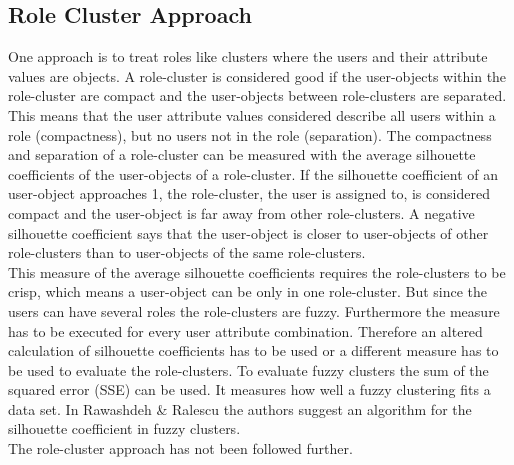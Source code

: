         \subsection{Role Cluster Approach}
        One approach is to treat roles like clusters where the users and their attribute values are objects. A role-cluster is considered good if the user-objects within the role-cluster are compact and the user-objects between role-clusters are separated. This means that the user attribute values considered describe all users within a role (compactness), but no users not in the role (separation). The compactness and separation of a role-cluster can be measured with the average silhouette coefficients of the user-objects of a role-cluster\cite{Han}. If the silhouette coefficient of an user-object approaches 1, the role-cluster, the user is assigned to, is considered compact and the user-object is far away from other role-clusters. A negative silhouette coefficient says that the user-object is closer to user-objects of other role-clusters than to user-objects of the same role-clusters.\\
        This measure of the average silhouette coefficients requires the role-clusters to be crisp, which means a user-object can be only in one role-cluster. But since the users can have several roles the role-clusters are fuzzy. Furthermore the measure has to be executed for every user attribute combination. Therefore an altered calculation of silhouette coefficients has to be used or a different measure has to be used to evaluate the role-clusters. To evaluate fuzzy clusters the sum of the squared error (SSE) can be used\cite{Han}. It measures how well a fuzzy clustering fits a data set. In Rawashdeh \& Ralescu\cite{rawashdeh2012fuzzy} the authors suggest an algorithm for the silhouette coefficient in fuzzy clusters.\\
        The role-cluster approach has not been followed further.\\
